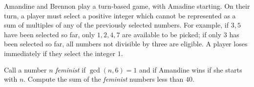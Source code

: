 Amandine and Brennon play a turn-based game, with Amadine starting.
On their turn, a player must select a positive integer which cannot be represented as a sum of multiples of any of the previously selected numbers.
For example, if $3, 5$ have been selected so far, only $1, 2, 4, 7$ are available to be picked;
if only $3$ has been selected so far, all numbers not divisible by three are eligible.
A player loses immediately if they select the integer $1$.

Call a number $n$ \emph{feminist} if $\gcd(n, 6) = 1$ and if Amandine wins if she starts with $n$. Compute the sum of the \emph{feminist} numbers less than $40$.
